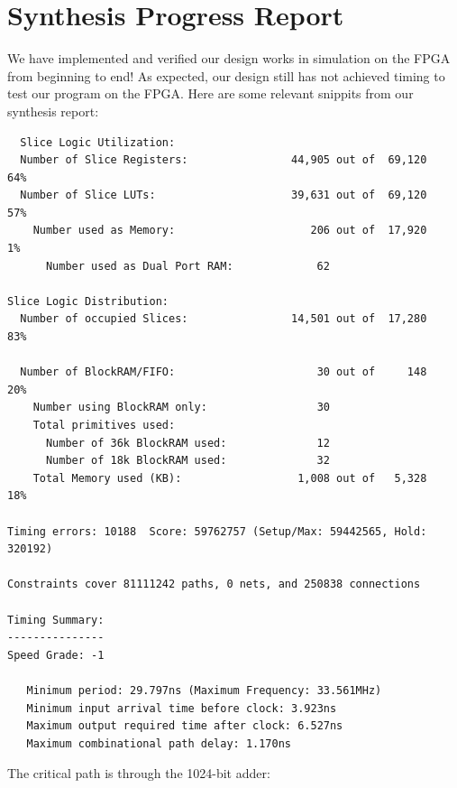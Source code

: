 \documentclass[12pt]{article}
\begin{document}
\section{Synthesis Progress Report}
We have implemented and verified our design works in simulation on the FPGA from beginning to end!  As expected, our design still has not achieved timing to test our program on the FPGA.  Here are some relevant snippits from our synthesis report: \
\begin{verbatim}
  Slice Logic Utilization:
  Number of Slice Registers:                44,905 out of  69,120   64%
  Number of Slice LUTs:                     39,631 out of  69,120   57%
    Number used as Memory:                     206 out of  17,920    1%
      Number used as Dual Port RAM:             62

Slice Logic Distribution:
  Number of occupied Slices:                14,501 out of  17,280   83%

  Number of BlockRAM/FIFO:                      30 out of     148   20%
    Number using BlockRAM only:                 30
    Total primitives used:
      Number of 36k BlockRAM used:              12
      Number of 18k BlockRAM used:              32
    Total Memory used (KB):                  1,008 out of   5,328   18%

Timing errors: 10188  Score: 59762757 (Setup/Max: 59442565, Hold: 320192)

Constraints cover 81111242 paths, 0 nets, and 250838 connections

Timing Summary:
---------------
Speed Grade: -1

   Minimum period: 29.797ns (Maximum Frequency: 33.561MHz)
   Minimum input arrival time before clock: 3.923ns
   Maximum output required time after clock: 6.527ns
   Maximum combinational path delay: 1.170ns
\end{verbatim}

The critical path is through the 1024-bit adder:
\end{document}
